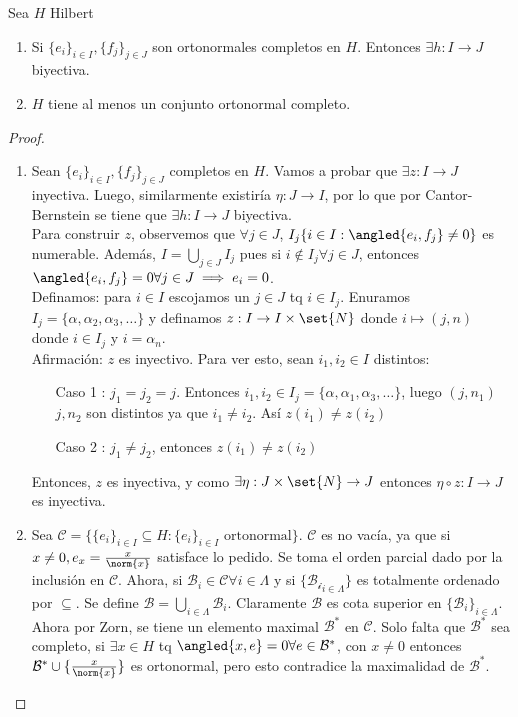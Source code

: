 \documentclass{notetaking}
\begin{document}
\begin{thm}
    Sea \(H\) Hilbert
    \begin{enumerate}
        \item Si \(\{e_i\}_{i\in I},\{f_j\}_{j\in J}\) son ortonormales completos en \(H\). Entonces \(\exists h: I\rightarrow J\) biyectiva.
        \item \(H\) tiene al menos un conjunto ortonormal completo.
    \end{enumerate}
\end{thm}
\begin{proof}
    \
    \begin{enumerate}
        \item Sean \(\{e_i\}_{i\in I},\{f_j\}_{j\in J}\) completos en \(H\). Vamos a probar que \(\exists z: I\rightarrow J\) inyectiva. Luego, similarmente existiría \(\eta: J\rightarrow I\), por lo que por Cantor-Bernstein se tiene que \(\exists h: I\rightarrow J\) biyectiva.\\
              Para construir \(z\), observemos que \(\forall j\in J\), \(I_j\{i\in I:\angled{e_i,f_j}\neq0\}\) es numerable. Además, \(I=\bigcup_{j\in J}I_j\) pues si \(i\notin I_j\forall j\in J\), entonces \(\angled{e_i,f_j}=0\forall j\in J\implies e_i=0\).\\
              Definamos: para \(i\in I\) escojamos un \(j\in J\) tq \(i\in I_j\). Enuramos \(I_j=\{\alpha,\alpha_2,\alpha_3,\dots\}\) y definamos \(z: I\rightarrow I\times\set{N}\) donde \(i\mapsto (j,n)\) donde \(i\in I_j\) y \(i=\alpha_n\).\\
              Afirmación: \(z\) es inyectivo. Para ver esto, sean \(i_1,i_2\in I\) distintos:
              \begin{itemize}
                  \item[Caso 1]: \(j_1=j_2=j\). Entonces \(i_1,i_2\in I_j=\{\alpha,\alpha_1,\alpha_3,\dots\}\), luego \((j,n_1)\) \(j,n_2\) son distintos ya que \(i_1\neq i_2\). Así \(z(i_1)\neq z(i_2)\)
                  \item[Caso 2]: \(j_1\neq j_2\), entonces \(z(i_1)\neq z(i_2)\)
              \end{itemize}
              Entonces, \(z\) es inyectiva, y como \(\exists\eta:J\times\set{N}\rightarrow J\) entonces \(\eta\circ z:I\rightarrow J\) es inyectiva.
        \item Sea \(\mathcal{C}=\{\{e_i\}_{i\in I}\subseteq H: \{e_i\}_{i\in I}\text{ ortonormal}\}\). \(\mathcal{C}\) es no vacía, ya que si \(x\neq 0,e_x=\frac{x}{\norm{x}}\) satisface lo pedido. Se toma el orden parcial dado por la inclusión en \(\mathcal{C}\). Ahora, si \(\mathcal{B}_i\in\mathcal{C}\forall i\in \Lambda\) y si \(\{\mathcal{B_i}_{i\in\Lambda}\}\) es totalmente ordenado por \(\subseteq\). Se define \(\mathcal{B}=\bigcup_{i\in\Lambda}\mathcal{B}_i\). Claramente \(\mathcal{B}\) es cota superior en \(\{\mathcal{B}_i\}_{i\in\Lambda}\). Ahora por Zorn, se tiene un elemento maximal \(\mathcal{B}^*\) en \(\mathcal{C}\). Solo falta que \(\mathcal{B}^*\) sea completo, si \(\exists x\in H\) tq \(\angled{x,e}=0\forall e\in\mathcal{B}^*\), con \(x\neq 0\) entonces \(\mathcal{B}^*\cup\{\frac{x}{\norm{x}}\}\) es ortonormal, pero esto contradice la maximalidad de \(\mathcal{B}^*\).

\end{enumerate}
\end{proof}
\end{document}
